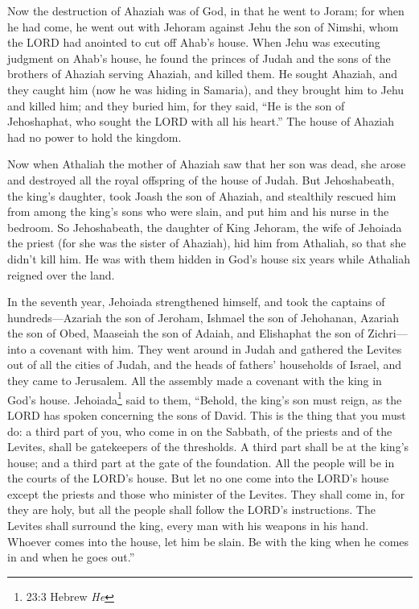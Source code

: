 \myverse{}Now the destruction of Ahaziah was of God, in that he went to
Joram; for when he had come, he went out with Jehoram against Jehu the son of Nimshi, whom the LORD had
anointed to cut off Ahab’s house.
\myverse{}When Jehu was executing judgment on Ahab’s house, he found the princes of Judah
and the sons of the brothers of Ahaziah serving Ahaziah, and killed them.
\myverse{}He sought Ahaziah, and they caught him (now he was hiding in Samaria), and
they brought him to Jehu and killed him; and they buried him, for they said, “He is the son of Jehoshaphat,
who sought the LORD with all his heart.” The house of Ahaziah had no power to hold the kingdom.

\myverse{}Now when Athaliah the mother of Ahaziah saw that her son was
dead, she arose and destroyed all the royal offspring of the house of Judah.
\myverse{}But Jehoshabeath, the king’s daughter, took Joash the son of Ahaziah, and
stealthily rescued him from among the king’s sons who were slain, and put him and his nurse in the bedroom.
So Jehoshabeath, the daughter of King Jehoram, the wife of Jehoiada the priest (for she was the sister
of Ahaziah), hid him from Athaliah, so that she didn’t kill him.
\myverse{}He was with them hidden in God’s house six years while Athaliah reigned over
the land.


\mychapter{} \myverse*{}In the seventh year, Jehoiada strengthened himself, and took the
captains of hundreds—Azariah the son of Jeroham, Ishmael the son of Jehohanan, Azariah the son of Obed,
Maaseiah the son of Adaiah, and Elishaphat the son of Zichri—into a covenant with him.
\myverse{}They went around in Judah and gathered the Levites out of all the cities of
Judah, and the heads of fathers’ households of Israel, and they came to Jerusalem.
\myverse{}All the assembly made a covenant with the king in God’s house. Jehoiada\footnote{23:3 Hebrew \textit{He}} said to them, “Behold, the king’s son must reign, as the LORD has spoken concerning
the sons of David.
\myverse{}This is the thing that you must do: a third part of you, who come in on the
Sabbath, of the priests and of the Levites, shall be gatekeepers of the thresholds.
\myverse{}A third part shall be at the king’s house; and a third part at the gate of
the foundation. All the people will be in the courts of the LORD’s house.
\myverse{}But let no one come into the LORD’s house except the priests and those who
minister of the Levites. They shall come in, for they are holy, but all the people shall follow the LORD’s
instructions.
\myverse{}The Levites shall surround the king, every man with his weapons in his hand.
Whoever comes into the house, let him be slain. Be with the king when he comes in and when he goes out.”

